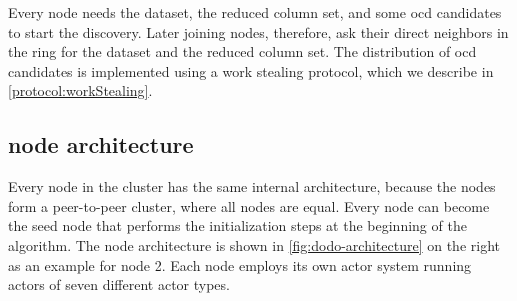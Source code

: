   Every node needs the dataset, the reduced column set, and some \gls{ocd} candidates to start the discovery.
  Later joining nodes, therefore, ask their direct neighbors in the ring for the dataset and the reduced column set.
  The distribution of \gls{ocd} candidates is implemented using a work stealing protocol, which we describe in \cref{protocol:workStealing}.

\subsection{\dodo{} node architecture}\label{sec:node-architecture}

  Every node in the cluster has the same internal architecture, because the nodes form a peer-to-peer cluster, where all nodes are equal.
  Every node can become the seed node that performs the initialization steps at the beginning of the algorithm.
  The node architecture is shown in \cref{fig:dodo-architecture} on the right as an example for node 2.
  Each node employs its own actor system running actors of seven different actor types.

